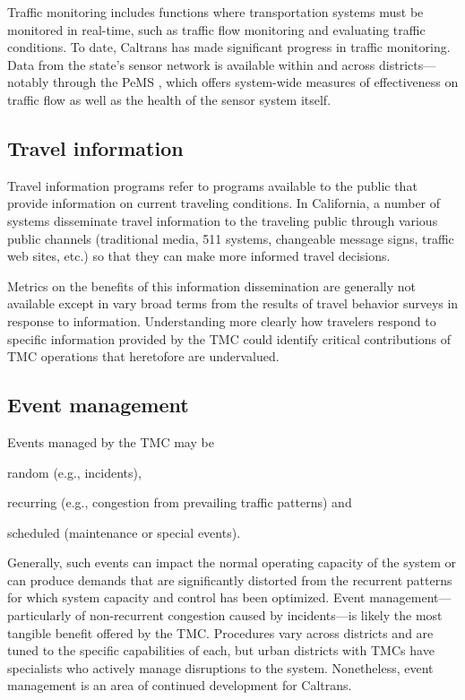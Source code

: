 \documentclass[12pt]{report}
\newcounter{time}
\begin{document}
Traffic monitoring includes functions where transportation systems
must be monitored in real-time, such as traffic flow monitoring and
evaluating traffic conditions. To date, Caltrans has made significant
progress in traffic monitoring. Data from the state's sensor network
is available within and across districts---notably through the
\acf{PeMS} \citep{choe02:_freew_perfor_measur_system_pems}, which
offers system-wide measures of effectiveness on traffic flow as well
as the health of the sensor system itself.

\subsection{Travel information}
\label{sec:trav-info}

Travel information programs refer to programs available to the public
that provide information on current traveling conditions. In
California, a number of systems disseminate travel information to the
traveling public through various public channels (traditional media,
511 systems, changeable message signs, traffic web sites, etc.) so
that they can make more informed travel decisions.

Metrics on the benefits of this information dissemination are
generally not available except in vary broad terms from the results of
travel behavior surveys in response to information. Understanding more
clearly how travelers respond to specific information provided by the
\ac{TMC} could identify critical contributions of \ac{TMC} operations that
heretofore are undervalued.

\subsection{Event management}
\label{sec:event-man}

Events managed by the \ac{TMC} may be
\begin{inparaenum}[(1)]
\item random (e.g., incidents),
\item recurring (e.g., congestion from prevailing traffic patterns)
  and
\item scheduled (maintenance or special events).
\end{inparaenum}
Generally, such events can impact the normal operating capacity of the
system or can produce demands that are significantly distorted from
the recurrent patterns for which system capacity and control has been
optimized.  Event management---particularly of non-recurrent
congestion caused by incidents---is likely the most tangible benefit
offered by the \ac{TMC}. Procedures vary across districts and are
tuned to the specific capabilities of each, but urban districts with
\acp{TMC} have specialists who actively manage disruptions to the
system. Nonetheless, event management is an area of continued
development for Caltrans.
\end{document}
